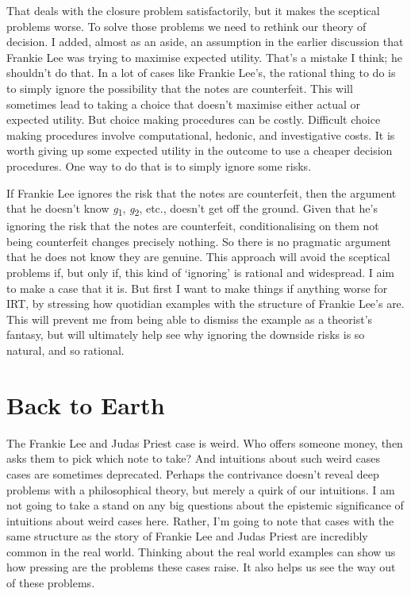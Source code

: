 \documentclass[
  12pt,
  letterpaper,
]{scrbook}
\begin{document}
That deals with the closure problem satisfactorily, but it makes the
sceptical problems worse. To solve those problems we need to rethink our
theory of decision. I added, almost as an aside, an assumption in the
earlier discussion that Frankie Lee was trying to maximise expected
utility. That's a mistake I think; he shouldn't do that. In a lot of
cases like Frankie Lee's, the rational thing to do is to simply ignore
the possibility that the notes are counterfeit. This will sometimes lead
to taking a choice that doesn't maximise either actual or expected
utility. But choice making procedures can be costly. Difficult choice
making procedures involve computational, hedonic, and investigative
costs. It is worth giving up some expected utility in the outcome to use
a cheaper decision procedures. One way to do that is to simply ignore
some risks.

If Frankie Lee ignores the risk that the notes are counterfeit, then the
argument that he doesn't know \emph{g}\textsubscript{1},
\emph{g}\textsubscript{2}, etc., doesn't get off the ground. Given that
he's ignoring the risk that the notes are counterfeit, conditionalising
on them not being counterfeit changes precisely nothing. So there is no
pragmatic argument that he does not know they are genuine. This approach
will avoid the sceptical problems if, but only if, this kind of
`ignoring' is rational and widespread. I aim to make a case that it is.
But first I want to make things if anything worse for IRT, by stressing
how quotidian examples with the structure of Frankie Lee's are. This
will prevent me from being able to dismiss the example as a theorist's
fantasy, but will ultimately help see why ignoring the downside risks is
so natural, and so rational.

\section{Back to Earth}\label{sec-backearth}

The Frankie Lee and Judas Priest case is weird. Who offers someone
money, then asks them to pick which note to take? And intuitions about
such weird cases cases are sometimes deprecated. Perhaps the contrivance
doesn't reveal deep problems with a philosophical theory, but merely a
quirk of our intuitions. I am not going to take a stand on any big
questions about the epistemic significance of intuitions about weird
cases here. Rather, I'm going to note that cases with the same structure
as the story of Frankie Lee and Judas Priest are incredibly common in
the real world. Thinking about the real world examples can show us how
pressing are the problems these cases raise. It also helps us see the
way out of these problems.
\end{document}
